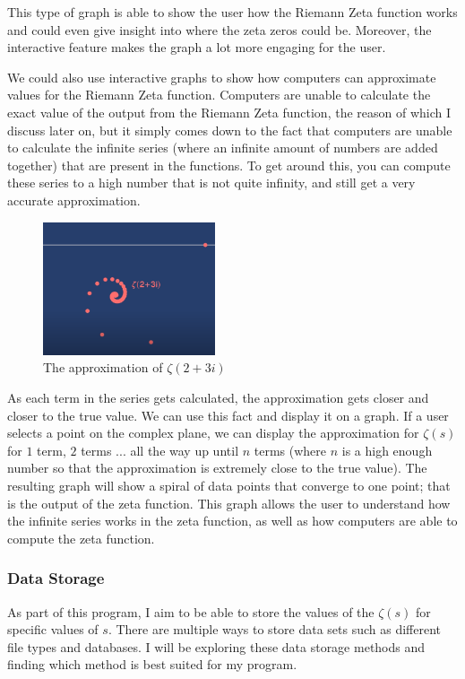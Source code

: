 \documentclass[12pt]{article}
\begin{document}
This type of graph is able to show the user how the Riemann Zeta function works and could even give insight into where the zeta zeros could be. Moreover, the interactive feature makes the graph a lot more engaging for the user.


We could also use interactive graphs to show how computers can approximate values for the Riemann Zeta function. Computers are unable to calculate the exact value of the output from the Riemann Zeta function, the reason of which I discuss later on, but it simply comes down to the fact that computers are unable to calculate the infinite series (where an infinite amount of numbers are added together) that are present in the functions. To get around this, you can compute these series to a high number that is not quite infinity, and still get a very accurate approximation.


\begin{figure}
    \centering
    \captionsetup{justification=centering}
    \includegraphics[width=2.0in]{zeta-approximation}
    \caption{The approximation of $\zeta(2+3i)$}
\end{figure}

As each term in the series gets calculated, the approximation gets closer and closer to the true value. We can use this fact and display it on a graph. If a user selects a point on the complex plane, we can display the approximation for $\zeta(s)$ for $1$ term, $2$ terms ... all the way up until $n$ terms (where $n$ is a high enough number so that the approximation is extremely close to the true value). The resulting graph will show a spiral of data points that converge to one point; that is the output of the zeta function. This graph allows the user to understand how the infinite series works in the zeta function, as well as how computers are able to compute the zeta function.
\\
\subsubsection{Data Storage}

As part of this program, I aim to be able to store the values of the $\zeta(s)$ for specific values of $s$. There are multiple ways to store data sets such as different file types and databases. I will be exploring these data storage methods and finding which method is best suited for my program.
\end{document}
